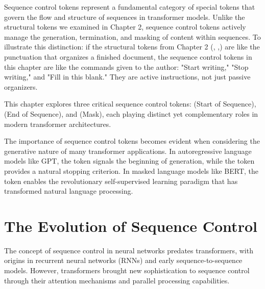 
Sequence control tokens represent a fundamental category of special tokens that govern the flow and structure of sequences in transformer models. Unlike the structural tokens we examined in Chapter 2, sequence control tokens actively manage the generation, termination, and masking of content within sequences. To illustrate this distinction: if the structural tokens from Chapter 2 (\cls{}, \sep{}) are like the punctuation that organizes a finished document, the sequence control tokens in this chapter are like the commands given to the author: "Start writing," "Stop writing," and "Fill in this blank." They are active instructions, not just passive organizers.

This chapter explores three critical sequence control tokens: \sos{} (Start of Sequence), \eos{} (End of Sequence), and \mask{} (Mask), each playing distinct yet complementary roles in modern transformer architectures.
\begin{comment}
Feedback: The distinction between "structural tokens" and "sequence control tokens" is a good one. To make it even sharper, you could use an analogy. For example: "If the structural tokens from Chapter 2 ([CLS], [SEP]) are like the punctuation that organizes a finished document, the sequence control tokens in this chapter are like the commands given to the author: 'Start writing,' 'Stop writing,' and 'Fill in this blank.' They are active instructions, not just passive organizers."
STATUS: addressed - added the suggested analogy to clarify the distinction between structural and sequence control tokens
\end{comment}

The importance of sequence control tokens becomes evident when considering the generative nature of many transformer applications. In autoregressive language models like GPT, the \sos{} token signals the beginning of generation, while the \eos{} token provides a natural stopping criterion. In masked language models like BERT, the \mask{} token enables the revolutionary self-supervised learning paradigm that has transformed natural language processing.

\section{The Evolution of Sequence Control}

The concept of sequence control in neural networks predates transformers, with origins in recurrent neural networks (RNNs) and early sequence-to-sequence models. However, transformers brought new sophistication to sequence control through their attention mechanisms and parallel processing capabilities.

